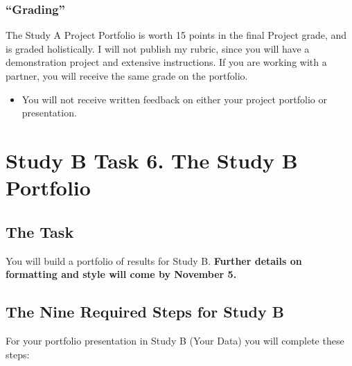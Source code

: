 \documentclass[]{book}
\providecommand{\tightlist}{%
  \setlength{\itemsep}{0pt}\setlength{\parskip}{0pt}}
\begin{document}
\hypertarget{grading-9}{%
\subsection{``Grading''}\label{grading-9}}

The Study A Project Portfolio is worth 15 points in the final Project grade, and is graded holistically. I will not publish my rubric, since you will have a demonstration project and extensive instructions. If you are working with a partner, you will receive the same grade on the portfolio.

\begin{itemize}
\tightlist
\item
  You will not receive written feedback on either your project portfolio or presentation.
\end{itemize}

\hypertarget{task6b}{%
\chapter{Study B Task 6. The Study B Portfolio}\label{task6b}}

\hypertarget{the-task-7}{%
\section{The Task}\label{the-task-7}}

You will build a portfolio of results for Study B. \textbf{Further details on formatting and style will come by November 5.}

\hypertarget{the-nine-required-steps-for-study-b}{%
\section{The Nine Required Steps for Study B}\label{the-nine-required-steps-for-study-b}}

For your portfolio presentation in Study B (Your Data) you will complete these steps:
\end{document}
